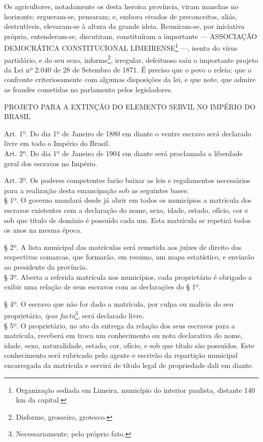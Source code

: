 Os agricultores, notadamente os desta heroica província, viram manchas
no horizonte; ergueram-se, pensaram; e, embora eivados de preconceitos,
aliás, destrutíveis, elevaram-se à altura da grande ideia. Reuniram-se,
por iniciativa própria, entenderam-se, discutiram, constituíram a
importante --- ASSOCIAÇÃO DEMOCRÁTICA CONSTITUCIONAL
LIMEIRENSE\footnote{Organização sediada em Limeira, município do
  interior paulista, distante 140 km da capital.} ---, isenta do vírus
partidário, e do seu sexo, informe\footnote{Disforme, grosseiro,
  grotesco.}, irregular, defeituoso saiu o importante projeto da Lei nº
2.040 de 28 de Setembro de 1871. É preciso que o povo o releia; que o
confronte criteriosamente com algumas disposições da lei, e que note,
que admire as fraudes cometidas no parlamento pelos legisladores.

PROJETO PARA A EXTINÇÃO DO ELEMENTO SERVIL NO IMPÉRIO DO BRASIL

Art. 1º. Do dia 1º de Janeiro de 1880 em diante o ventre escravo será
declarado livre em todo o Império do Brasil.\\
Art. 2º. Do dia 1º de Janeiro de 1904 em diante será proclamada a
liberdade geral dos escravos no Império.

Art. 3º. Os poderes competentes farão baixar as leis e regulamentos
necessários para a realização desta emancipação sob as seguintes
bases:\\
§ 1º. O governo mandará desde já abrir em todos os municípios a
matrícula dos escravos existentes com a declaração do nome, sexo, idade,
estado, ofício, cor e sob que título de domínio é possuído cada um. Esta
matrícula se repetirá todos os anos na mesma época.

§ 2º. A lista municipal das matrículas será remetida aos juízes de
direito das respectivas comarcas, que formarão, em resumo, um mapa
estatístico, e enviarão ao presidente da província.\\
§ 3º. Aberta a referida matrícula nos municípios, cada proprietário é
obrigado a exibir uma relação de seus escravos com as declarações do §
1º.

§ 4º. O escravo que não for dado a matrícula, por culpa ou malícia do
seu proprietário, \emph{ipso facto}\footnote{Necessariamente; pelo
  próprio fato.}, será declarado livre.\\
§ 5º. O proprietário, no ato da entrega da relação dos seus escravos
para a matrícula, receberá em troca um conhecimento ou nota declarativa
do nome, idade, sexo, naturalidade, estado, cor, ofício, e sob que
título são possuídos. Este conhecimento será rubricado pelo agente e
escrivão da repartição municipal encarregada da matrícula e servirá de
título legal de propriedade dali em diante.

